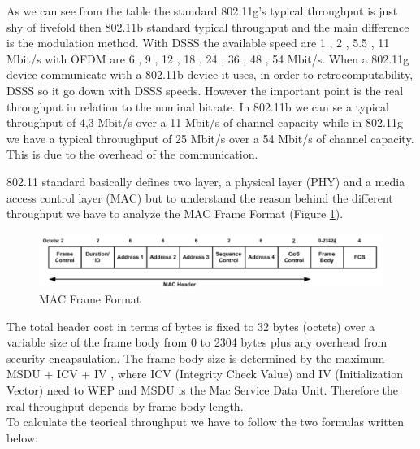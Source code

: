 	As we can see from the table the standard 802.11g's typical throughput is just shy of fivefold then 802.11b standard typical throughput and the main difference is the modulation method.
	With DSSS the available speed are 1 , 2 , 5.5 , 11 Mbit/s with OFDM are 6 , 9 , 12 , 18 , 24 , 36 , 48 , 54 Mbit/s. When a 802.11g device communicate with a 802.11b device it uses, in order to retrocomputability, DSSS  so it go down with DSSS speeds.
	However the important point is the real throughput in relation to the nominal bitrate.
	In 802.11b we can se a typical throughput of 4,3 Mbit/s over a 11 Mbit/s of channel capacity while in 802.11g we have a typical throuughput of 25 Mbit/s over a 54 Mbit/s of channel capacity. This is due to the overhead of the communication.
	
	802.11 standard basically defines two layer, a physical layer (PHY) and a media access control layer (MAC) but to understand the reason behind the different throughput we have to analyze the MAC Frame Format (Figure \ref{mac_packet}).
	
	\begin{figure}[h!]
		\includegraphics[angle=0, keepaspectratio=true, width=15cm]{../images/mac_header2}
		\caption{MAC Frame Format}
		\label{mac_packet}
	\end{figure}
	
	The total header cost in terms of bytes is fixed to 32 bytes (octets) over a variable size of the frame body from 0 to 2304 bytes plus any overhead from security encapsulation. The frame body size is determined by the maximum MSDU + ICV + IV , where ICV (Integrity Check Value) and IV (Initialization Vector) need to WEP and MSDU is the Mac Service Data Unit. Therefore the real throughput depends by frame body length.\\
	
	
	To calculate the teorical throughput we have to follow the two formulas written below:
	
